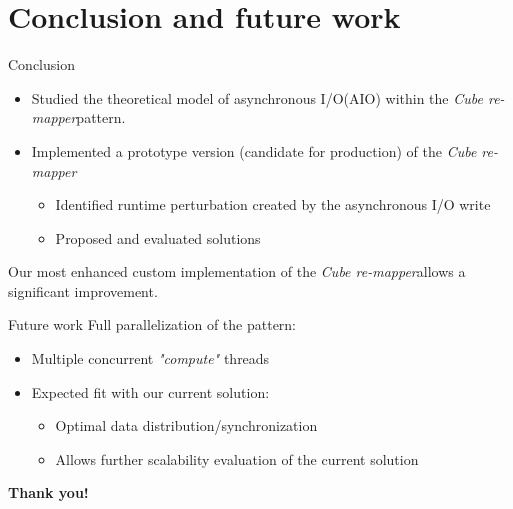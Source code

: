 \documentclass[slidestop,xcolor=dvipsnames, notes=hide]{beamer}
\newcommand{\toolTargetSoftware}			{\emph{Cube re-mapper}}
\newcommand{\notationIO}					{I/O}
\newcommand{\notationaio}					{asynchronous \notationIO}
\begin{document}
\section{Conclusion and future work}
	\begin{frame}[c]{Conclusion}
		\begin{itemize}
			\item Studied the theoretical model of \notationaio\space (AIO) within the \toolTargetSoftware\space pattern.
			\pause
			\item Implemented a prototype version (candidate for production) of the \toolTargetSoftware\space
			\pause
			\begin{itemize}
				\item Identified runtime perturbation created by the asynchronous I/O write
				\item Proposed and evaluated solutions
			\end{itemize}
		\end{itemize}

		\pause
		Our most enhanced custom implementation of the \toolTargetSoftware\space allows a significant improvement.
	\end{frame}


	\begin{frame}[c]{Future work}
		Full parallelization of the pattern:
		\begin{itemize}
			\item Multiple concurrent \emph{"compute"} threads
			\item Expected fit with our current solution:
			\begin{itemize}
				\item Optimal data distribution/synchronization
				\item Allows further scalability evaluation of the current solution
			\end{itemize}
		\end{itemize}
	\end{frame}


\begin{frame}
\vspace{1cm} 
\begin{center}
\huge{\textbf{Thank you!}}
\end{center}
\end{frame}





	
\end{document}
